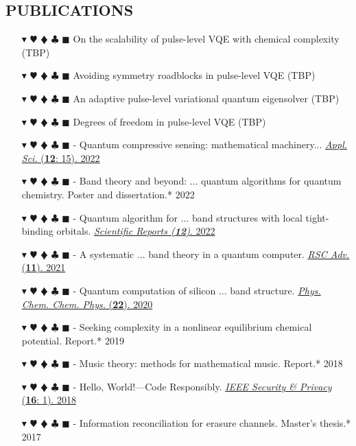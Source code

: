 \documentclass[overlapped, 10pt]{res} %
\newcommand{\physics}{$\blacktriangledown$}
\newcommand{\biochem}{$\varheartsuit$}
\newcommand{\shannon}{$\vardiamondsuit$}
\newcommand{\classic}{$\clubsuit$}
\newcommand{\quantum}{$\blacksquare$}
\newcommand{\physicscolor}{\color{YellowOrange}}
\newcommand{\biochemcolor}{\color{Emerald}}
\newcommand{\shannoncolor}{\color{Goldenrod}}
\newcommand{\classiccolor}{\color{Cyan}}
\newcommand{\quantumcolor}{\color{RedOrange}}
\newcommand{\tag}[1]{
    {\IfSubStr{#1}{\physics}{\physicscolor}{\color{White}}\physics}
    {\IfSubStr{#1}{\biochem}{\biochemcolor}{\color{White}}\biochem}
    {\IfSubStr{#1}{\shannon}{\shannoncolor}{\color{White}}\shannon}
    {\IfSubStr{#1}{\classic}{\classiccolor}{\color{White}}\classic}
    {\IfSubStr{#1}{\quantum}{\quantumcolor}{\color{White}}\quantum}
}
\begin{document}
\begin{resume}
\section{PUBLICATIONS}
\begin{itemize} \itemsep -2pt %
\item[\tag{\physics\biochem\shannon\quantum}] On the scalability of pulse-level VQE with chemical complexity (TBP)
\item[\tag{\physics\biochem\shannon\quantum}] Avoiding symmetry roadblocks in pulse-level VQE (TBP)
\item[\tag{\physics\biochem\shannon\quantum}] An adaptive pulse-level variational quantum eigensolver (TBP)
\item[\tag{\physics\biochem\shannon\quantum}] Degrees of freedom in pulse-level VQE (TBP)
\item[\tag{\shannon\quantum}-] Quantum compressive sensing: mathematical machinery...
    \hfill \href{https://arxiv.org/abs/2204.13035}{\textit{Appl. Sci.} (\textbf{12}: 15). 2022}
\item[\tag{\physics\biochem\shannon\quantum}-] Band theory and beyond: ... quantum algorithms for quantum chemistry.
    \hfill Poster and dissertation.* 2022
\item[\tag{\physics\quantum}-] Quantum algorithm for ... band structures with local tight-binding orbitals.
    \hfill \href{https://doi.org/10.21203/rs.3.rs-1318951/v1}{\textit{Scientific Reports (\textbf{12})}. 2022}
\item[\tag{\physics\quantum}-] A systematic ... band theory in a quantum computer.
    \hfill \href{https://arxiv.org/abs/2104.03409}{\textit{RSC Adv.} (\textbf{11}). 2021}
\item[\tag{\physics\quantum}-] Quantum computation of silicon ... band structure.
    \hfill \href{https://arxiv.org/abs/2006.03807}{\textit{Phys. Chem. Chem. Phys.} (\textbf{22}). 2020}
\item[\tag{\biochem}-] Seeking complexity in a nonlinear equilibrium chemical potential.
    \hfill Report.* 2019
\item[\tag{}-] Music theory: methods for mathematical music.
    \hfill Report.* 2018
\item[\tag{\classic}-] Hello, World!—Code Responsibly.
    \hfill \href{https://ieeexplore.ieee.org/document/8283486}{\textit{IEEE Security \& Privacy} (\textbf{16}: 1). 2018}
\item[\tag{\shannon\classic}-] Information reconciliation for erasure channels.
    \hfill Master's thesis.* 2017

\end{itemize}
\end{resume}
\end{document}
